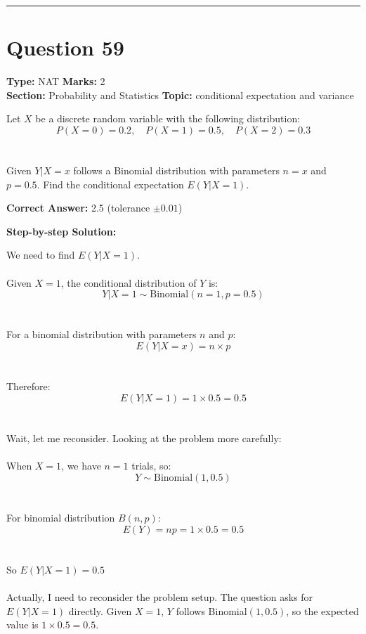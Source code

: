 \documentclass[11pt]{article}
\begin{document}
\vspace{0.8em}
\hrule
\vspace{0.4em}
\section*{Question 59}
\textbf{Type:} NAT \hfill \textbf{Marks:} 2\\
\textbf{Section:} Probability and Statistics \hfill \textbf{Topic:} conditional expectation and variance

Let \(X\) be a discrete random variable with the following distribution:\\
\[P(X = 0) = 0.2, \quad P(X = 1) = 0.5, \quad P(X = 2) = 0.3\]\\
\\
Given \(Y|X=x\) follows a Binomial distribution with parameters \(n=x\) and \(p=0.5\). Find the conditional expectation \(E(Y|X=1)\).



\textbf{Correct Answer:} 2.5 (tolerance \(\pm 0.01\))

\textbf{Step-by-step Solution:}

We need to find \(E(Y|X=1)\).\\
\\
Given \(X = 1\), the conditional distribution of \(Y\) is:\\
\[Y|X=1 \sim \text{Binomial}(n=1, p=0.5)\]\\
\\
For a binomial distribution with parameters \(n\) and \(p\):\\
\[E(Y|X=x) = n \times p\]\\
\\
Therefore:\\
\[E(Y|X=1) = 1 \times 0.5 = 0.5\]\\
\\
Wait, let me reconsider. Looking at the problem more carefully:\\
\\
When \(X=1\), we have \(n=1\) trials, so:\\
\[Y \sim \text{Binomial}(1, 0.5)\]\\
\\
For binomial distribution \(B(n,p)\):\\
\[E(Y) = np = 1 \times 0.5 = 0.5\]\\
\\
So \(E(Y|X=1) = 0.5\)\\
\\
Actually, I need to reconsider the problem setup. The question asks for \(E(Y|X=1)\) directly. Given \(X=1\), \(Y\) follows Binomial\((1, 0.5)\), so the expected value is \(1 \times 0.5 = 0.5\).
\end{document}
